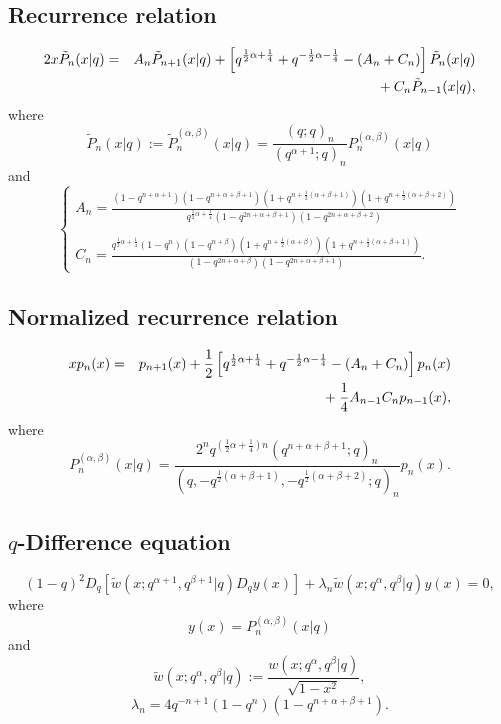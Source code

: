 \documentclass[envcountchap,graybox]{svmono}
\newcommand{\mathindent}{\hspace{7.5mm}}
\begin{document}
\subsection*{Recurrence relation}
\begin{eqnarray}
\label{RecContqJacobi}
2x{\tilde P}_n(x|q)&=&A_n{\tilde P}_{n+1}(x|q)+\left[q^{\frac{1}{2}\alpha+\frac{1}{4}}+
q^{-\frac{1}{2}\alpha-\frac{1}{4}}-\left(A_n+C_n\right)\right]{\tilde P}_n(x|q)\nonumber\\
& &{}\mathindent{}+C_n{\tilde P}_{n-1}(x|q),
\end{eqnarray}
where
$$
{\tilde P}_n(x|q):={\tilde P}_n^{(\alpha,\beta)}(x|q)=\frac{(q;q)_n}{(q^{\alpha+1};q)_n}P_n^{(\alpha,\beta)}(x|q)$$
and
$$\left\{\begin{array}{l}
\displaystyle A_n=\frac{(1-q^{n+\alpha+1})(1-q^{n+\alpha+\beta+1})(1+q^{n+\frac{1}{2}(\alpha+\beta+1)})(1+q^{n+\frac{1}{2}(\alpha+\beta+2)})}
{q^{\frac{1}{2}\alpha+\frac{1}{4}}(1-q^{2n+\alpha+\beta+1})(1-q^{2n+\alpha+\beta+2})}\\
\\
\displaystyle C_n=\frac{q^{\frac{1}{2}\alpha+\frac{1}{4}}(1-q^n)(1-q^{n+\beta})(1+q^{n+\frac{1}{2}(\alpha+\beta)})(1+q^{n+\frac{1}{2}(\alpha+\beta+1)})}
{(1-q^{2n+\alpha+\beta})(1-q^{2n+\alpha+\beta+1})}.
\end{array}\right.$$

\subsection*{Normalized recurrence relation}
\begin{eqnarray}
\label{NormRecContqJacobi}
xp_n(x)&=&p_{n+1}(x)+\frac{1}{2}\left[q^{\frac{1}{2}\alpha+\frac{1}{4}}+
q^{-\frac{1}{2}\alpha-\frac{1}{4}}-(A_n+C_n)\right]p_n(x)\nonumber\\
& &{}\mathindent{}+\frac{1}{4}A_{n-1}C_np_{n-1}(x),
\end{eqnarray}
where
$$P_n^{(\alpha,\beta)}(x|q)=\frac{2^nq^{(\frac{1}{2}\alpha+\frac{1}{4})n}(q^{n+\alpha+\beta+1};q)_n}
{(q,-q^{\frac{1}{2}(\alpha+\beta+1)},-q^{\frac{1}{2}(\alpha+\beta+2)};q)_n}p_n(x).$$

\subsection*{$q$-Difference equation}
\begin{equation}
\label{dvContqJacobi}
(1-q)^2D_q\left[{\tilde w}(x;q^{\alpha+1},q^{\beta+1}|q)D_qy(x)\right]+
\lambda_n{\tilde w}(x;q^{\alpha},q^{\beta}|q)y(x)=0,
\end{equation}
where
$$y(x)=P_n^{(\alpha,\beta)}(x|q)$$
and
$${\tilde w}(x;q^{\alpha},q^{\beta}|q):=\frac{w(x;q^{\alpha},q^{\beta}|q)}{\sqrt{1-x^2}},$$
$$\lambda_n=4q^{-n+1}(1-q^n)(1-q^{n+\alpha+\beta+1}).$$
\end{document}
